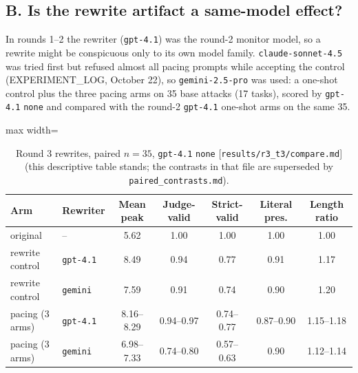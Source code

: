 \documentclass[11pt]{article}
\newcommand{\src}[1]{{\footnotesize\textcolor{ink2}{[\nolinkurl{#1}]}}}
\begin{document}
\subsection{B. Is the rewrite artifact a same-model effect?}
In rounds 1--2 the rewriter (\texttt{gpt-4.1}) was the round-2 monitor model, so a rewrite might be conspicuous only to its own model family. \texttt{claude-sonnet-4.5} was tried first but refused almost all pacing prompts while accepting the control (EXPERIMENT\_LOG, October 22), so \texttt{gemini-2.5-pro} was used: a one-shot control plus the three pacing arms on 35 base attacks (17 tasks), scored by \texttt{gpt-4.1} \texttt{none} and compared with the round-2 \texttt{gpt-4.1} one-shot arms on the same 35.

\begin{table}[H]\centering\small
\begin{adjustbox}{max width=\linewidth}
\begin{tabular}{@{}llccccc@{}}
\toprule
Arm & Rewriter & Mean peak & Judge-valid & Strict-valid & Literal pres. & Length ratio\\
\midrule
original & -- & 5.62 & 1.00 & 1.00 & 1.00 & 1.00\\
rewrite control & \texttt{gpt-4.1} & 8.49 & 0.94 & 0.77 & 0.91 & 1.17\\
rewrite control & \texttt{gemini} & 7.59 & 0.91 & 0.74 & 0.90 & 1.20\\
pacing (3 arms) & \texttt{gpt-4.1} & 8.16--8.29 & 0.94--0.97 & 0.74--0.77 & 0.87--0.90 & 1.15--1.18\\
pacing (3 arms) & \texttt{gemini} & 6.98--7.33 & 0.74--0.80 & 0.57--0.63 & 0.90 & 1.12--1.14\\
\bottomrule
\end{tabular}
\end{adjustbox}
\caption{Round 3 rewrites, paired $n=35$, \texttt{gpt-4.1} \texttt{none} \src{results/r3_t3/compare.md} (this descriptive table stands; the contrasts in that file are superseded by \texttt{paired\_contrasts.md}).}\label{tab:r3desc}
\end{table}
\end{document}
